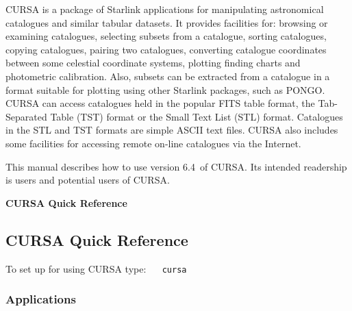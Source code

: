 \documentclass[twoside,11pt]{article}
\newcommand{\CURSAversion}{6.4~}
\newcommand{\stardocabstract}
{CURSA is a package of Starlink applications for manipulating astronomical
catalogues and similar tabular datasets. It provides facilities for:
browsing or examining catalogues, selecting subsets from a catalogue,
sorting catalogues, copying catalogues, pairing two catalogues, converting
catalogue coordinates between some celestial coordinate systems, plotting
finding charts and photometric calibration.  Also, subsets can be extracted
from a catalogue in a format suitable for plotting using other Starlink
packages, such as PONGO.  CURSA can access catalogues held in the popular
FITS table format, the Tab-Separated Table (TST) format or the Small Text
List (STL) format.  Catalogues in the STL and TST formats are simple ASCII
text files.  CURSA also includes some facilities for accessing remote
on-line catalogues via the Internet.

This manual describes how to use version \CURSAversion of CURSA.  Its
intended readership is users and potential users of CURSA.}
\newenvironment{latexonly}{}{}
\renewcommand{\_}{\texttt{\symbol{95}}}
\begin{document}
\stardocabstract


\newpage
\begin{latexonly}
\begin{center}
{\Large\bf CURSA Quick Reference}
\end{center}
\end{latexonly}

\begin{htmlonly}
\section*{CURSA Quick Reference}
\end{htmlonly}

To set up for using CURSA type: ~~ {\tt cursa}

\subsubsection*{Applications}
\end{document}
